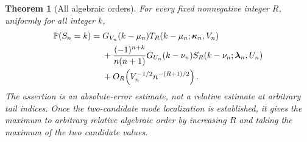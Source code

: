 \documentclass[11pt,a4paper]{article}
\numberwithin{equation}{section}
\newtheorem{theorem}{Theorem}[section]
\theoremstyle{definition}\newtheorem{definition}[theorem]{Definition}
\theoremstyle{remark}\newtheorem{remark}[theorem]{Remark}
\begin{document}
\begin{theorem}[All algebraic orders]\label{tfp:thm:allorders}
For every fixed nonnegative integer $R$, uniformly for all integer $k$,
\begin{equation}\label{tfp:eq:allorders}
\begin{split}
 \mathbb P(S_n=k)={}&G_{V_n}(k-\mu_n)
          T_R(k-\mu_n;\boldsymbol\kappa_n,V_n)\\
 &+\frac{(-1)^{n+k}}{n(n+1)}G_{U_n}(k-\nu_n)
          S_R(k-\nu_n;\boldsymbol\lambda_n,U_n)\\
 &+O_R\!\left(V_n^{-1/2}n^{-(R+1)/2}\right).
\end{split}
\end{equation}
The assertion is an absolute-error estimate, not a relative estimate
at arbitrary tail indices. Once the two-candidate mode localization is
established, it gives the maximum to arbitrary relative algebraic order
by increasing $R$ and taking the maximum of the two candidate values.
\end{theorem}
\end{document}
